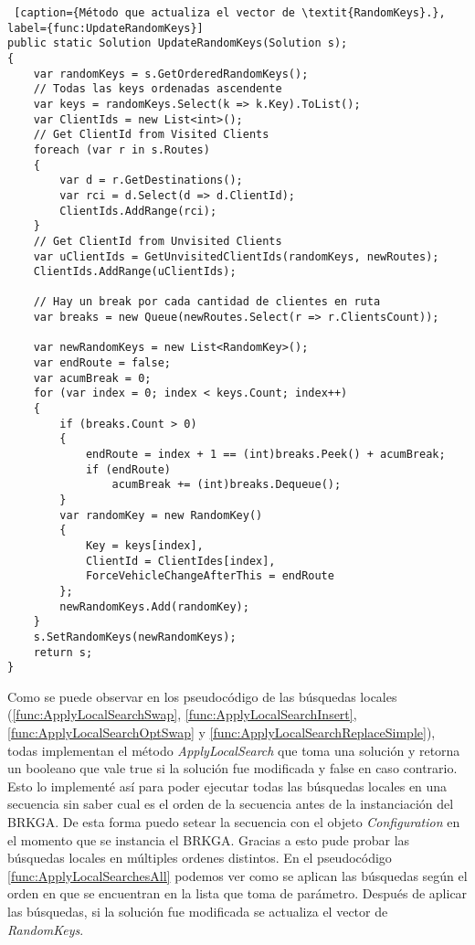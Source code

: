 \begin{minipage}{\textwidth}
\begin{lstlisting} [caption={Método que actualiza el vector de \textit{RandomKeys}.}, label={func:UpdateRandomKeys}]
public static Solution UpdateRandomKeys(Solution s);
{
	var randomKeys = s.GetOrderedRandomKeys();
	// Todas las keys ordenadas ascendente
	var keys = randomKeys.Select(k => k.Key).ToList();
	var ClientIds = new List<int>();
	// Get ClientId from Visited Clients
	foreach (var r in s.Routes)
	{
		var d = r.GetDestinations();
		var rci = d.Select(d => d.ClientId);
		ClientIds.AddRange(rci);
	}
	// Get ClientId from Unvisited Clients
	var uClientIds = GetUnvisitedClientIds(randomKeys, newRoutes);
	ClientIds.AddRange(uClientIds);

	// Hay un break por cada cantidad de clientes en ruta 
	var breaks = new Queue(newRoutes.Select(r => r.ClientsCount));

	var newRandomKeys = new List<RandomKey>();
	var endRoute = false;
	var acumBreak = 0;
	for (var index = 0; index < keys.Count; index++)
	{
		if (breaks.Count > 0)
		{		
			endRoute = index + 1 == (int)breaks.Peek() + acumBreak;
			if (endRoute)
				acumBreak += (int)breaks.Dequeue();
		}		
		var randomKey = new RandomKey()
		{
			Key = keys[index],
			ClientId = ClientIdes[index],
			ForceVehicleChangeAfterThis = endRoute
		};
		newRandomKeys.Add(randomKey);
	}
	s.SetRandomKeys(newRandomKeys);
	return s;
}
\end{lstlisting}
\end{minipage}

Como se puede observar en los pseudocódigo de las búsquedas locales (\ref{func:ApplyLocalSearchSwap}, \ref{func:ApplyLocalSearchInsert}, \ref{func:ApplyLocalSearchOptSwap} y \ref{func:ApplyLocalSearchReplaceSimple}), todas implementan el método \textit{ApplyLocalSearch} que toma una solución y retorna un booleano que vale true si la solución fue modificada y false en caso contrario. Esto lo implementé así para poder ejecutar todas las búsquedas locales en una secuencia sin saber cual es el orden de la secuencia antes de la instanciación del BRKGA. De esta forma puedo setear la secuencia con el objeto \textit{Configuration} en el momento que se instancia el BRKGA. Gracias a esto pude probar las búsquedas locales en múltiples ordenes distintos. En el pseudocódigo \ref{func:ApplyLocalSearchesAll} podemos ver como se aplican las búsquedas según el orden en que se encuentran en la lista que toma de parámetro. Después de aplicar las búsquedas, si la solución fue modificada se actualiza el vector de \textit{RandomKeys}.

